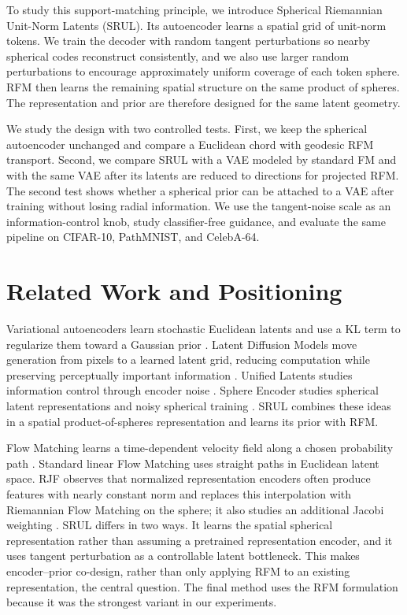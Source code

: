 \documentclass{article}
\begin{document}
To study this support-matching principle, we introduce Spherical Riemannian Unit-Norm Latents (SRUL). Its autoencoder learns a spatial grid of unit-norm tokens. We train the decoder with random tangent perturbations so nearby spherical codes reconstruct consistently, and we also use larger random perturbations to encourage approximately uniform coverage of each token sphere. RFM then learns the remaining spatial structure on the same product of spheres. The representation and prior are therefore designed for the same latent geometry.

We study the design with two controlled tests. First, we keep the spherical autoencoder unchanged and compare a Euclidean chord with geodesic RFM transport. Second, we compare SRUL with a VAE modeled by standard FM and with the same VAE after its latents are reduced to directions for projected RFM. The second test shows whether a spherical prior can be attached to a VAE after training without losing radial information. We use the tangent-noise scale as an information-control knob, study classifier-free guidance, and evaluate the same pipeline on CIFAR-10, PathMNIST, and CelebA-64.

\section{Related Work and Positioning}
Variational autoencoders learn stochastic Euclidean latents and use a KL term to regularize them toward a Gaussian prior \cite{vae}. Latent Diffusion Models move generation from pixels to a learned latent grid, reducing computation while preserving perceptually important information \cite{ldm}. Unified Latents studies information control through encoder noise \cite{ul}. Sphere Encoder studies spherical latent representations and noisy spherical training \cite{sphere}. SRUL combines these ideas in a spatial product-of-spheres representation and learns its prior with RFM.

Flow Matching learns a time-dependent velocity field along a chosen probability path \cite{fm}. Standard linear Flow Matching uses straight paths in Euclidean latent space. RJF observes that normalized representation encoders often produce features with nearly constant norm and replaces this interpolation with Riemannian Flow Matching on the sphere; it also studies an additional Jacobi weighting \cite{rjf}. SRUL differs in two ways. It learns the spatial spherical representation rather than assuming a pretrained representation encoder, and it uses tangent perturbation as a controllable latent bottleneck. This makes encoder--prior co-design, rather than only applying RFM to an existing representation, the central question. The final method uses the RFM formulation because it was the strongest variant in our experiments.
\end{document}
